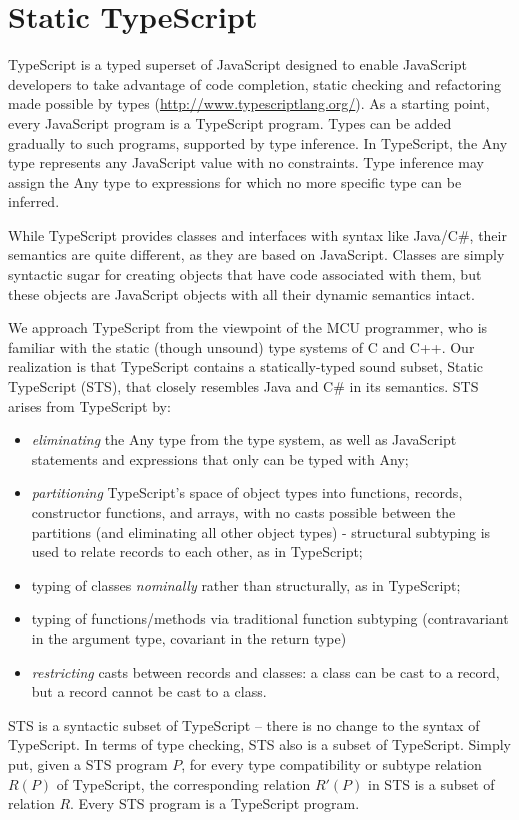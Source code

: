 \section{Static TypeScript}
\label{sec:sts}

TypeScript is a typed superset of JavaScript designed to enable JavaScript developers to take advantage of code
completion, static checking and refactoring made possible by types (\url{http://www.typescriptlang.org/}).
As a starting point, every JavaScript program is a TypeScript program.  Types can be added gradually to such programs,
supported by type inference.
In TypeScript, the Any type
represents any JavaScript value with no constraints. Type inference may assign the Any type to expressions for which
no more specific type can be inferred.

While TypeScript provides classes and interfaces with syntax like Java/C\#, their semantics
are quite different, as they are based on JavaScript.  Classes are simply syntactic sugar for creating objects that
have code associated with them, but these objects are JavaScript objects with all their dynamic semantics intact.

We approach TypeScript from the viewpoint of the MCU programmer, who is
familiar with the static (though unsound) type systems of C and C++. Our realization is that TypeScript contains a
statically-typed sound subset, Static TypeScript (STS), that closely resembles Java and C\# in its semantics.
STS arises from TypeScript by:
\begin{itemize}
\item \emph{eliminating} the Any type from the type system, as well as JavaScript statements
and expressions that only can be typed with Any;
\item \emph{partitioning} TypeScript's space of object types into functions, records, constructor functions, and arrays, with no casts
    possible between the partitions (and eliminating all other object types) - structural subtyping is used to relate records
    to each other, as in TypeScript;

\item typing of classes \emph{nominally} rather than structurally, as in TypeScript;
\item typing of functions/methods via traditional function subtyping (contravariant
    in the argument type, covariant in the return type)
\item \emph{restricting} casts between records and classes: a class can be cast to a record, but a record cannot be cast to a class.
\end{itemize}
STS is a syntactic subset of TypeScript -- there is no change to the syntax of TypeScript.
In terms of type checking, STS also is a subset of TypeScript. Simply put, given a STS program $P$,
for every type compatibility or subtype relation $R(P)$ of TypeScript, the corresponding relation $R'(P)$ in STS
is a subset of relation $R$. Every STS program is a TypeScript program.

